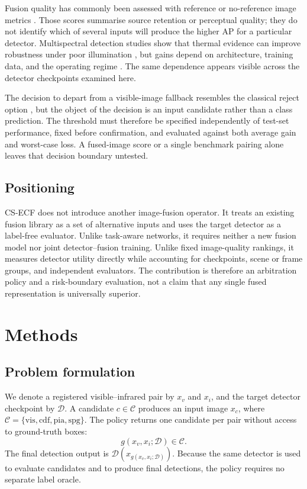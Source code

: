 \documentclass[preprint,11pt]{elsarticle}
\begin{document}
Fusion quality has commonly been assessed with reference or no-reference image
metrics \cite{ma2019survey,mudavath2026review}. Those scores summarise source
retention or perceptual quality; they do not identify which of several inputs
will produce the higher AP for a particular detector. Multispectral
detection studies show that thermal evidence can improve robustness under
poor illumination \cite{li2010thermal,guo2024prior}, but gains depend on
architecture, training data, and the operating regime
\cite{abdar2021uncertainty,gawlikowski2023uncertainty}. The same dependence appears
visible across the detector checkpoints examined here.

The decision to depart from a visible-image fallback resembles the classical
reject option \cite{chow1970reject}, but the object of the decision is an input
candidate rather than a class prediction. The threshold must therefore be
specified independently of test-set performance, fixed before confirmation, and
evaluated against both average gain and worst-case loss. A fused-image score or
a single benchmark pairing alone leaves that decision boundary untested.

\subsection{Positioning}

CS-ECF does not introduce another image-fusion operator. It treats an existing
fusion library as a set of alternative inputs and uses the target detector as a
label-free evaluator. Unlike task-aware networks, it requires neither a new
fusion model nor joint detector--fusion training. Unlike fixed image-quality
rankings, it measures detector utility directly while accounting for
checkpoints, scene or frame groups, and independent evaluators. The contribution
is therefore an arbitration policy and a risk-boundary evaluation, not a claim
that any single fused representation is universally superior.

\section{Methods}

\subsection{Problem formulation}

We denote a registered visible--infrared pair by \(x_v\) and \(x_i\), and the
target detector checkpoint by \(\mathcal{D}\). A candidate
\(c\in\mathcal{C}\) produces an input image \(x_c\), where
\(\mathcal{C}=\{\mathrm{vis},\mathrm{cdf},\mathrm{pia},\mathrm{spg}\}\).
The policy returns one candidate per pair without access to ground-truth boxes:
\begin{equation}
g(x_v,x_i;\mathcal{D})\in\mathcal{C}.
\end{equation}
The final detection output is
\(\mathcal{D}(x_{g(x_v,x_i;\mathcal{D})})\). Because the same detector is used
to evaluate candidates and to produce final detections, the policy requires no
separate label oracle.
\end{document}
